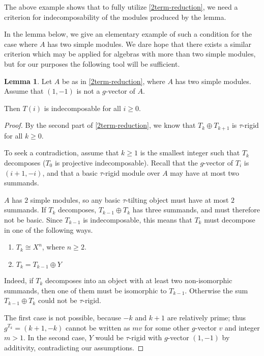 \documentclass[]{article}
\theoremstyle{definition}
\newtheorem{lemma}{Lemma}[section]
\newcommand{\tu}{\ensuremath{\tau}}
\begin{document}
The above example shows that to fully utilize \cref{2term-reduction}, we need a criterion for indecomposability of the modules produced by the lemma. 

In the lemma below, we give an elementary example of such a condition for the case where $A$ has two simple modules. We dare hope that there exists a similar criterion which may be applied for algebras with more than two simple modules, but for our purposes the following tool will be sufficient.

\begin{lemma}\label{2-simple-criterion-T_i}
	Let $A$ be as in \cref{2term-reduction}, where $A$ has two simple modules. Assume that $(1,-1)$ is not a $g$-vector of $A$.	
	
	Then $T(i)$ is indecomposable for all $i \geq 0$.
\end{lemma}

\begin{proof}
	 By the second part of \cref{2term-reduction}, we know that $T_k \oplus T_{k+1}$ is $\tu$-rigid for all $k \geq 0$.
	 
	 To seek a contradiction, assume that $k \geq 1$ is the smallest integer such that $T_k$ decomposes ($T_0$ is projective indecomposable). Recall that the $g$-vector of $T_i$ is $(i+1,-i)$, and that a basic \tu-rigid module over $A$ may have at most two summands.
	 
	 $A$ has $2$ simple modules, so any basic $\tu$-tilting object must have at most $2$ summands.  If $T_k$ decomposes, $T_{k-1} \oplus T_k$ has three summands, and must therefore not be basic. Since $T_{k-1}$ is indecomposable, this means that $T_k$ must decompose in one of the following ways.
	 
	 \begin{enumerate}
	 	\item $T_k \cong X^n$, where $n \geq 2$.
	 	\item $T_k = T_{k-1} \oplus Y$ 
	 	
	 \end{enumerate} 
	 
	 Indeed, if $T_k$ decomposes into an object with at least two non-isomorphic summands, then one of them must be isomorphic to $T_{k-1}$. Otherwise the sum $T_{k-1} \oplus T_k$ could not be \tu-rigid.
	 	 
	 The first case is not possible, because $-k$ and $k+1$ are relatively prime; thus $g^{T_k} = (k+1,-k)$ cannot be written as $m v$ for some other $g$-vector $v$ and integer $m > 1$. In the second case, $Y$ would be $\tu$-rigid with $g$-vector $(1,-1)$ by additivity, contradicting our assumptions. 
\end{proof}
\end{document}
